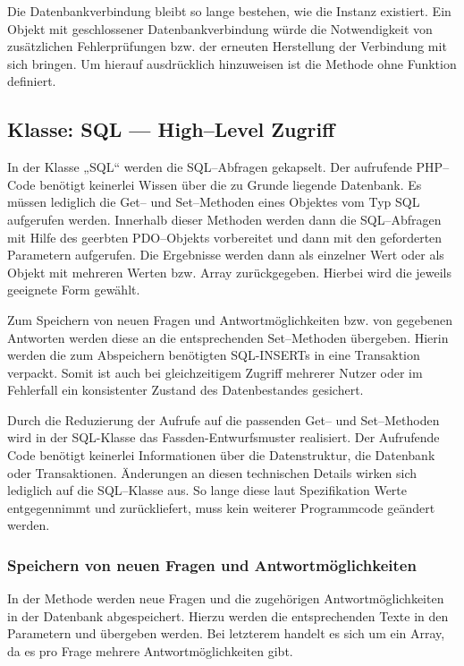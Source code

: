 Die Datenbankverbindung bleibt so lange bestehen, wie die Instanz existiert. Ein Objekt mit geschlossener Datenbankverbindung würde die Notwendigkeit von zusätzlichen Fehlerprüfungen bzw. der erneuten Herstellung der Verbindung mit sich bringen. Um hierauf ausdrücklich hinzuweisen ist die Methode  ohne Funktion definiert.
 
\subsection{Klasse: SQL --- High--Level Zugriff}

In der Klasse „SQL“ werden die SQL--Abfragen gekapselt. Der aufrufende PHP--Code benötigt keinerlei Wissen über die zu Grunde liegende Datenbank. Es müssen lediglich die Get-- und Set--Methoden eines Objektes vom Typ SQL aufgerufen werden. Innerhalb dieser Methoden werden dann die SQL--Abfragen mit Hilfe des geerbten PDO--Objekts vorbereitet und dann mit den geforderten Parametern aufgerufen. Die Ergebnisse werden dann als einzelner Wert oder als Objekt mit mehreren Werten bzw. Array zurückgegeben. Hierbei wird die jeweils geeignete Form gewählt.

Zum Speichern von neuen Fragen und Antwortmöglichkeiten bzw. von gegebenen Antworten werden diese an die entsprechenden Set--Methoden übergeben. Hierin werden die zum Abspeichern benötigten SQL-INSERTs in eine Transaktion verpackt. Somit ist auch bei gleichzeitigem Zugriff mehrerer Nutzer oder im Fehlerfall ein konsistenter Zustand des Datenbestandes gesichert.

Durch die Reduzierung der Aufrufe auf die passenden Get-- und Set--Methoden wird in der SQL-Klasse das Fassden-Entwurfsmuster realisiert. Der Aufrufende Code benötigt keinerlei Informationen über die Datenstruktur, die Datenbank oder Transaktionen. Änderungen an diesen technischen Details wirken sich lediglich auf die SQL--Klasse aus. So lange diese laut Spezifikation Werte entgegennimmt und zurückliefert, muss kein weiterer Programmcode geändert werden.

\subsubsection{Speichern von neuen Fragen und Antwortmöglichkeiten}
\label{sec:speichern}
In der Methode  werden neue Fragen und die zugehörigen Antwortmöglichkeiten in der Datenbank abgespeichert. Hierzu werden die entsprechenden Texte in den Parametern  und  übergeben werden. Bei letzterem handelt es sich um ein Array, da es pro Frage mehrere Antwortmöglichkeiten gibt.


